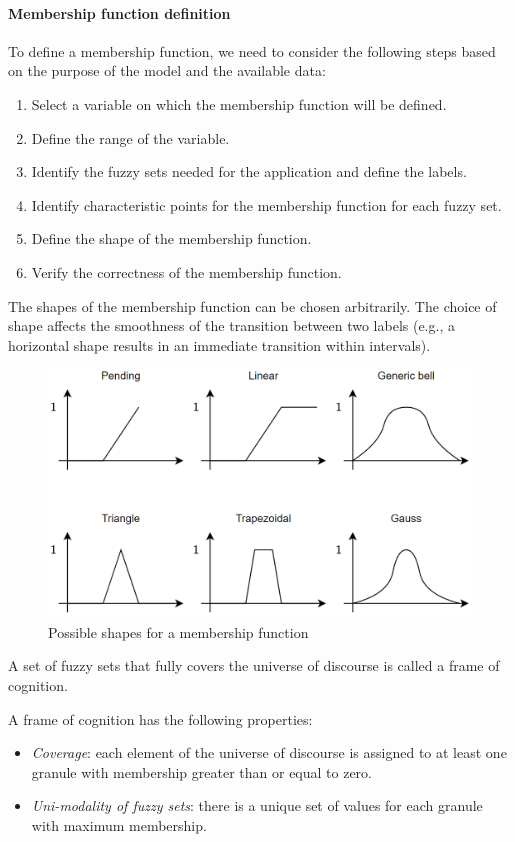 \paragraph*{Membership function definition}
To define a membership function, we need to consider the following steps based on the purpose of the model and the available data:
\begin{enumerate}
    \item Select a variable on which the membership function will be defined.
    \item Define the range of the variable.
    \item Identify the fuzzy sets needed for the application and define the labels.
    \item Identify characteristic points for the membership function for each fuzzy set.
    \item Define the shape of the membership function.
    \item Verify the correctness of the membership function.
\end{enumerate}
The shapes of the membership function can be chosen arbitrarily. 
The choice of shape affects the smoothness of the transition between two labels (e.g., a horizontal shape results in an immediate transition within intervals).
\begin{figure}[H]
    \centering
    \includegraphics[width=0.75\linewidth]{images/shape.png}
    \caption{Possible shapes for a membership function}
\end{figure}
\begin{definition}
    A set of fuzzy sets that fully covers the universe of discourse is called a frame of cognition. 
\end{definition}
A frame of cognition has the following properties:
\begin{itemize}
    \item \textit{Coverage}: each element of the universe of discourse is assigned to at least one granule with membership greater than or equal to zero.
    \item \textit{Uni-modality of fuzzy sets}: there is a unique set of values for each granule with maximum membership. 
\end{itemize}
